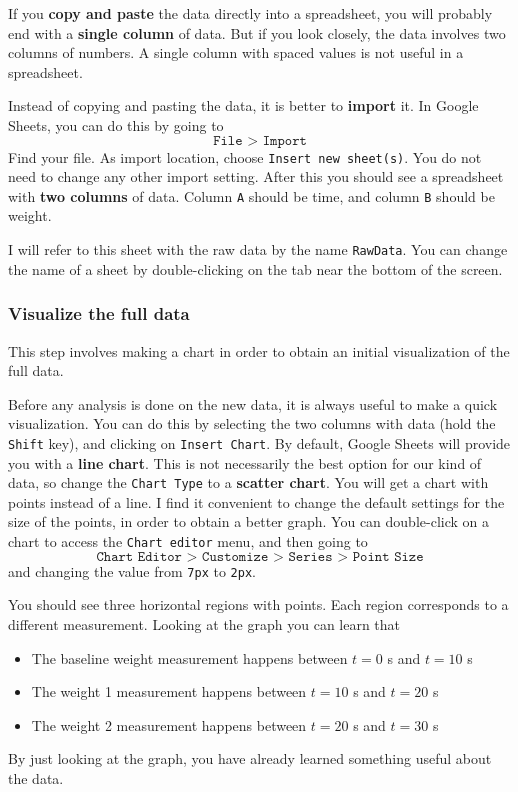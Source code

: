 If you \textbf{copy and paste} the data directly into a spreadsheet, you will probably end with a \textbf{single column} of data. But if you look closely, the data involves two columns of numbers. A single column with spaced values is not useful in a spreadsheet.

Instead of copying and pasting the data, it is better to \textbf{import} it. In Google Sheets, you can do this by going to
\begin{equation}
    \texttt{File > Import}
\end{equation}
Find your file. As import location, choose \texttt{Insert new sheet(s)}. You do not need to change any other import setting. After this you should see a spreadsheet with \textbf{two columns} of data. Column \texttt{A} should be time, and column \texttt{B} should be weight.

I will refer to this sheet with the raw data by the name \texttt{RawData}. You can change the name of a sheet by double-clicking on the tab near the bottom of the screen.
\subsubsection{Visualize the full data}
This step involves making a chart in order to obtain an initial visualization of the full data.

Before any analysis is done on the new data, it is always useful to make a quick visualization. You can do this by selecting the two columns with data (hold the \texttt{Shift} key), and clicking on \texttt{Insert Chart}. By default, Google Sheets will provide you with a \textbf{line chart}. This is not necessarily the best option for our kind of data, so change the \texttt{Chart Type} to a \textbf{scatter chart}. You will get a chart with points instead of a line. I find it convenient to change the default settings for the size of the points, in order to obtain a better graph. You can double-click on a chart to access the \texttt{Chart editor} menu, and then going to
\begin{equation}
    \texttt{Chart Editor > Customize > Series > Point Size}
\end{equation}
and changing the value from \texttt{7px} to \texttt{2px}.

You should see three horizontal regions with points. Each region corresponds to a different measurement. Looking at the graph you can learn that
\begin{itemize}
    \item The baseline weight measurement happens between $t = 0$ s and $t = 10$ s
    \item The weight 1 measurement happens between $t = 10$ s and $t = 20$ s
    \item The weight 2 measurement happens between $t = 20$ s and $t = 30$ s
\end{itemize}
By just looking at the graph, you have already learned something useful about the data.

